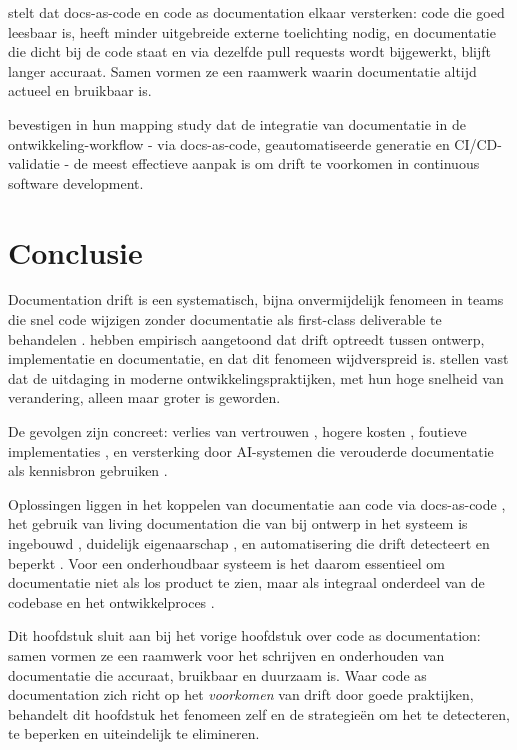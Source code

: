 \textcite{gentle2017docslikecode} stelt dat docs-as-code en code as documentation elkaar versterken: code die goed leesbaar is, heeft minder uitgebreide externe toelichting nodig, en documentatie die dicht bij de code staat en via dezelfde pull requests wordt bijgewerkt, blijft langer accuraat. Samen vormen ze een raamwerk waarin documentatie altijd actueel en bruikbaar is.

\textcite{theunissen2022mappingdocumentation} bevestigen in hun mapping study dat de integratie van documentatie in de ontwikkeling-workflow - via docs-as-code, geautomatiseerde generatie en CI/CD-validatie - de meest effectieve aanpak is om drift te voorkomen in continuous software development.

\section{Conclusie}
\label{sec:drift-conclusie}

Documentation drift is een systematisch, bijna onvermijdelijk fenomeen in teams die snel code wijzigen zonder documentatie als first-class deliverable te behandelen \autocite{whiting2020drifterosion}. \textcite{romeo2024didrift} hebben empirisch aangetoond dat drift optreedt tussen ontwerp, implementatie en documentatie, en dat dit fenomeen wijdverspreid is. \textcite{theunissen2022mappingdocumentation} stellen vast dat de uitdaging in moderne ontwikkelingspraktijken, met hun hoge snelheid van verandering, alleen maar groter is geworden.

De gevolgen zijn concreet: verlies van vertrouwen \autocite{bhatti2021docsdevelopers}, hogere kosten \autocite{tripathy2014softwareevolution}, foutieve implementaties \autocite{romeo2024didrift}, en versterking door AI-systemen die verouderde documentatie als kennisbron gebruiken \autocite{theunissen2022mappingdocumentation}.

Oplossingen liggen in het koppelen van documentatie aan code via docs-as-code \autocite{gentle2017docslikecode}, het gebruik van living documentation die van bij ontwerp in het systeem is ingebouwd \autocite{martraire2019livingdocumentation}, duidelijk eigenaarschap \autocite{bhatti2021docsdevelopers}, en automatisering die drift detecteert en beperkt \autocite{romeo2024didrift}. Voor een onderhoudbaar systeem is het daarom essentieel om documentatie niet als los product te zien, maar als integraal onderdeel van de codebase en het ontwikkelproces \autocite{gentle2017docslikecode}.

Dit hoofdstuk sluit aan bij het vorige hoofdstuk over code as documentation: samen vormen ze een raamwerk voor het schrijven en onderhouden van documentatie die accuraat, bruikbaar en duurzaam is. Waar code as documentation zich richt op het \textit{voorkomen} van drift door goede praktijken, behandelt dit hoofdstuk het fenomeen zelf en de strategieën om het te detecteren, te beperken en uiteindelijk te elimineren.

